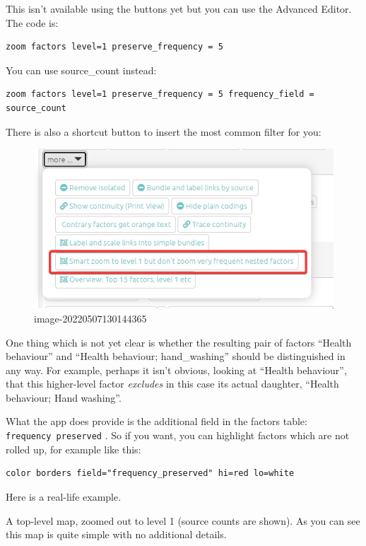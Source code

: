 \documentclass[
]{book}
\begin{document}
This isn't available using the buttons yet but you can use the Advanced Editor. The code is:

\begin{verbatim}
zoom factors level=1 preserve_frequency = 5
\end{verbatim}

You can use source\_count instead:

\begin{verbatim}
zoom factors level=1 preserve_frequency = 5 frequency_field = source_count
\end{verbatim}

There is also a shortcut button to insert the most common filter for you:

\begin{figure}
\centering
\includegraphics{_assets/image-20220507130144365.png}
\caption{image-20220507130144365}
\end{figure}

One thing which is not yet clear is whether the resulting pair of factors ``Health behaviour'' and ``Health behaviour; hand\_washing'' should be distinguished in any way. For example, perhaps it isn't obvious, looking at ``Health behaviour'', that this higher-level factor \emph{excludes} in this case its actual daughter, ``Health behaviour; Hand washing''.

What the app does provide is the additional field in the factors table: \texttt{frequency\ preserved} . So if you want, you can highlight factors which are not rolled up, for example like this:

\begin{verbatim}
color borders field="frequency_preserved" hi=red lo=white
\end{verbatim}

Here is a real-life example.

A top-level map, zoomed out to level 1 (source counts are shown). As you can see this map is quite simple with no additional details.
\end{document}
